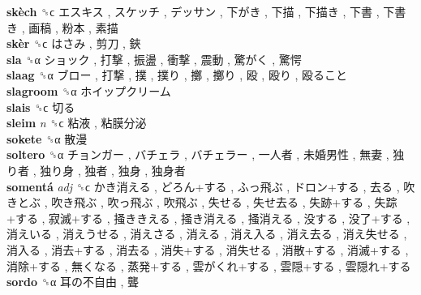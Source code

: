 \textbf{skèch} ␝ϲ   エスキス ,  スケッチ ,  デッサン ,  下がき ,  下描 ,  下描き ,  下書 ,  下書き ,  画稿 ,  粉本 ,  素描   \\
\textbf{skèr} ␝ϲ   はさみ ,  剪刀 ,  鋏   \\
\textbf{sla} ␝α   ショック ,  打撃 ,  振盪 ,  衝撃 ,  震動 ,  驚がく ,  驚愕   \\
\textbf{slaag} ␝α   ブロー ,  打撃 ,  撲 ,  撲り ,  擲 ,  擲り ,  殴 ,  殴り ,  殴ること   \\
\textbf{slagroom} ␝α   ホイップクリーム   \\
\textbf{slais} ␝ϲ   切る   \\
\textbf{sleim} \emph{n}  ␝ϲ   粘液 ,  粘膜分泌   \\
\textbf{sokete} ␝α   散漫   \\
\textbf{soltero} ␝α   チョンガー ,  バチェラ ,  バチェラー ,  一人者 ,  未婚男性 ,  無妻 ,  独り者 ,  独り身 ,  独者 ,  独身 ,  独身者   \\
\textbf{somentá} \emph{adj}  ␝ϲ   かき消える ,  どろん+する ,  ふっ飛ぶ ,  ドロン+する ,  去る ,  吹きとぶ ,  吹き飛ぶ ,  吹っ飛ぶ ,  吹飛ぶ ,  失せる ,  失せ去る ,  失跡+する ,  失踪+する ,  寂滅+する ,  掻ききえる ,  掻き消える ,  掻消える ,  没する ,  没了+する ,  消えいる ,  消えうせる ,  消えさる ,  消える ,  消え入る ,  消え去る ,  消え失せる ,  消入る ,  消去+する ,  消去る ,  消失+する ,  消失せる ,  消散+する ,  消滅+する ,  消除+する ,  無くなる ,  蒸発+する ,  雲がくれ+する ,  雲隠+する ,  雲隠れ+する   \\
\textbf{sordo} ␝α   耳の不自由 ,  聾   \\
